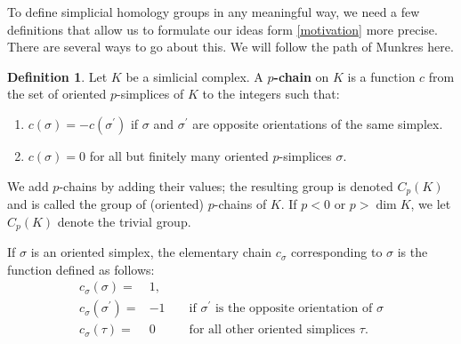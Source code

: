 \documentclass[draft,toc=bib]{scrartcl}
\theoremstyle{plain}
\theoremstyle{definition}
\newtheorem	{definition}[theorem]{Definition}
\theoremstyle{remark}
\begin{document}
%
%
%
%
%
%

To define simplicial homology groups in any meaningful way, we need a few definitions that allow us to formulate our ideas form \autoref{motivation} more precise. There are several ways to go about this. We will follow the path of Munkres \cite[p. 27]{mu} here.

\begin{definition}\label{def-chain}
	Let $K$ be a simlicial complex. A \textbf{$p$-chain} on $K$ is a function $c$ from the set of oriented $p$-simplices of $K$ to the integers such that:
	\begin{enumerate}
		\item $c(\sigma)=-c(\sigma^\prime)$ if $\sigma$ and $\sigma^\prime$ are opposite orientations of the same simplex.
		\item $c(\sigma)=0$ for all but finitely many oriented $p$-simplices $\sigma$.
	\end{enumerate}
We add $p$-chains by adding their values; the resulting group is denoted $C_p(K)$ and is called the group of (oriented) $p$-chains of $K$. If $p<0$ or $p>\dim K$, we let $C_p(K)$ denote the trivial group.

If $\sigma$ is an oriented simplex, the elementary chain $c_\sigma$ corresponding to $\sigma$ is the function defined as follows:
\begin{align*}c_\sigma(\sigma)=&1,\\
 c_\sigma(\sigma^\prime)=&-1&&\text{ if $\sigma^\prime$ is the opposite orientation of $\sigma$}\\
 c_\sigma(\tau)=&0 &&\text{ for all other oriented simplices $\tau$.} 
 \end{align*}
\end{definition}
\end{document}

